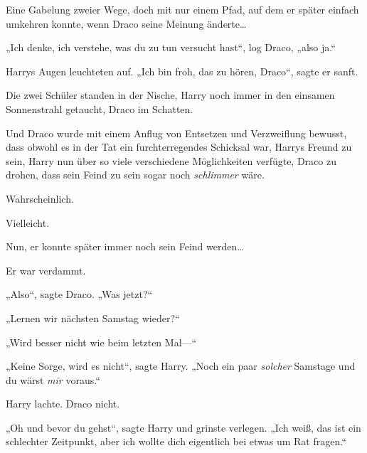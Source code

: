 Eine Gabelung zweier Wege, doch mit nur einem Pfad, auf dem er später einfach umkehren konnte, wenn Draco seine Meinung änderte…

„Ich denke, ich verstehe, was du zu tun versucht hast“, log Draco, „also ja.“

Harrys Augen leuchteten auf. „Ich bin froh, das zu hören, Draco“, sagte er sanft.

Die zwei Schüler standen in der Nische, Harry noch immer in den einsamen Sonnenstrahl getaucht, Draco im Schatten.

Und Draco wurde mit einem Anflug von Entsetzen und Verzweiflung bewusst, dass obwohl es in der Tat ein furchterregendes Schicksal war, Harrys Freund zu sein, Harry nun über so viele verschiedene Möglichkeiten verfügte, Draco zu drohen, dass sein Feind zu sein sogar noch \emph{schlimmer} wäre.

Wahrscheinlich.

Vielleicht.

Nun, er konnte später immer noch sein Feind werden…

Er war verdammt.

„Also“, sagte Draco. „Was jetzt?“

„Lernen wir nächsten Samstag wieder?“

„Wird besser nicht wie beim letzten Mal—“

„Keine Sorge, wird es nicht“, sagte Harry. „Noch ein paar \emph{solcher} Samstage und du wärst \emph{mir} voraus.“

Harry lachte. Draco nicht.

„Oh und bevor du gehst“, sagte Harry und grinste verlegen. „Ich weiß, das ist ein schlechter Zeitpunkt, aber ich wollte dich eigentlich bei etwas um Rat fragen.“

